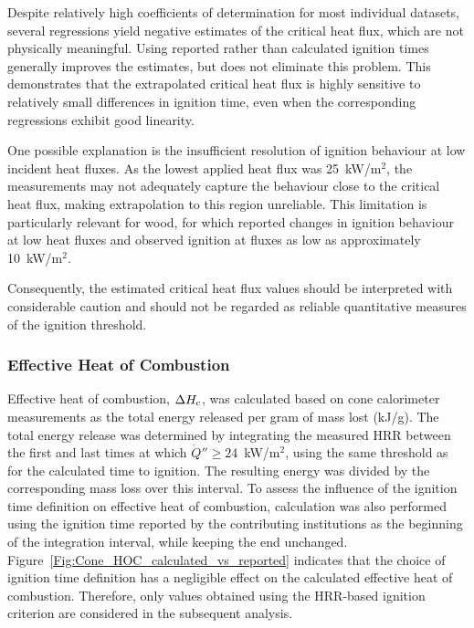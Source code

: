 \documentclass{book}
\begin{document}
Despite relatively high coefficients of determination for most individual datasets, several regressions yield negative estimates of the critical heat flux, which are not physically meaningful. Using reported rather than calculated ignition times generally improves the estimates, but does not eliminate this problem. This demonstrates that the extrapolated critical heat flux is highly sensitive to relatively small differences in ignition time, even when the corresponding regressions exhibit good linearity.

One possible explanation is the insufficient resolution of ignition behaviour at low incident heat fluxes. As the lowest applied heat flux was 25~kW/m$^2$, the measurements may not adequately capture the behaviour close to the critical heat flux, making extrapolation to this region unreliable. This limitation is particularly relevant for wood, for which \cite{SpearpointQuintiere2001} reported changes in ignition behaviour at low heat fluxes and observed ignition at fluxes as low as approximately 10~kW/m$^2$.

Consequently, the estimated critical heat flux values should be interpreted with considerable caution and should not be regarded as reliable quantitative measures of the ignition threshold.



\newpage
\subsubsection{Effective Heat of Combustion}

Effective heat of combustion, $\Delta H_{\rm c}$, was calculated based on cone calorimeter measurements as the total energy released per gram of mass lost (kJ/g). The total energy release was determined by integrating the measured HRR between the first and last times at which $\dot{Q}'' \ge 24$~kW/m$^2$, using the same threshold as for the calculated time to ignition. The resulting energy was divided by the corresponding mass loss over this interval. To assess the influence of the ignition time definition on effective heat of combustion, calculation was also performed using the ignition time reported by the contributing institutions as the beginning of the integration interval, while keeping the end unchanged.
Figure~\ref{Fig:Cone_HOC_calculated_vs_reported} indicates that the choice of ignition time definition has a negligible effect on the calculated effective heat of combustion. Therefore, only values obtained using the HRR-based ignition criterion are considered in the subsequent analysis.
\end{document}
